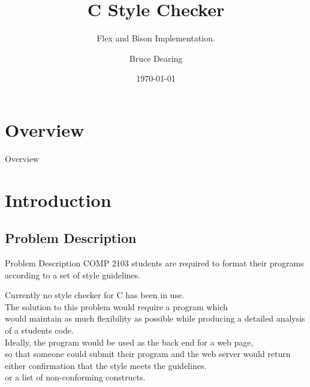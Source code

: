 \documentclass[compress]{beamer}
\title{C Style Checker}
\subtitle{Flex and Bison Implementation.}
\date{\today}
\author{Bruce Dearing}
\institute{Acadia University}
\begin{document}

\maketitle


\section*{Overview}
\begin{frame}{Overview}
    \tableofcontents[hideallsubsections]
\end{frame}


\section{Introduction}

\subsection{Problem Description}

\begin{frame}{Problem Description}
        COMP 2103 students are required to format their programs according to a set of style guidelines.
        
\note
{
    Currently no style checker for C has been in use. \\ 
    The solution to this problem would require a program
    which \\ would maintain as much flexibility as possible while producing a detailed analysis of a students code. \\
    Ideally, the program would be used as the back end for a web page, \\
    so that someone could submit their program and the web server would return either confirmation that the style meets the 
    guidelines.\\
    or a list of non-conforming constructs.
}
\end{frame}
\end{document}
